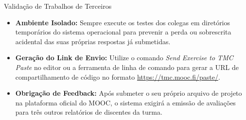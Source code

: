 \documentclass[11pt,a4paper]{article}
\begin{document}
\begin{exercicio}{Validação de Trabalhos de Terceiros}
\begin{itemize}
    \item \textbf{Ambiente Isolado:} Sempre execute os testes dos colegas em diretórios temporários do sistema operacional para prevenir a perda ou sobrescrita acidental das suas próprias respostas já submetidas.
    \item \textbf{Geração do Link de Envio:} Utilize o comando \textit{Send Exercise to TMC Paste} no editor ou a ferramenta de linha de comando para gerar a URL de compartilhamento de código no formato \url{https://tmc.mooc.fi/paste/}.
    \item \textbf{Obrigação de Feedback:} Após submeter o seu próprio arquivo de projeto na plataforma oficial do MOOC, o sistema exigirá a emissão de avaliações para três outros relatórios de discentes da turma.
\end{itemize}
\end{exercicio}
\end{document}
